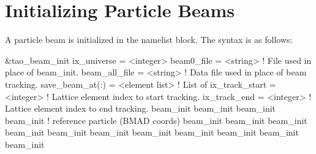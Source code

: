 {{{{{{{{{{{{%
\section{Initializing Particle Beams}
\label{s:beam.init}

A particle beam is initialized in the  namelist block.
The syntax is as follows:
\begin{example}
  &tao_beam_init
    ix_universe             = <integer>
    beam0_file              = <string>       ! File used in place of beam_init.
    beam_all_file           = <string>       ! Data file used in place of beam tracking.
    save_beam_at(:)         = <element list> ! List of 
    ix_track_start          = <integer>      ! Lattice element index to start tracking.
    ix_track_end            = <integer>      ! Lattice element index to end   tracking.
    beam_init%
    beam_init%
    beam_init%
    beam_init%
                                             ! reference particle (BMAD coords)
    beam_init%
    beam_init%
    beam_init%
    beam_init%
    beam_init%
    beam_init%
    beam_init%
    beam_init%
    beam_init%
    beam_init%
    beam_init%

\end{example}}}}}}}}}}}}}
